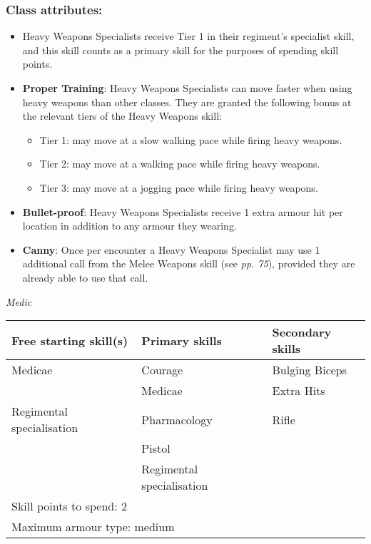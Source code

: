 \subsubsection{Class attributes:}

\begin{itemize}
\item Heavy Weapons Specialists receive Tier 1 in their regiment's specialist skill, and this skill counts as a primary skill for the purposes of spending skill points.

\item \textbf{Proper Training}: Heavy Weapons Specialists can move faster when using heavy weapons than other classes. They are granted the following bonus at the relevant tiers of the Heavy Weapons skill:

\begin{itemize}
\item Tier 1: may move at a slow walking pace while firing heavy weapons.

\item Tier 2: may move at a walking pace while firing heavy weapons.

\item Tier 3: may move at a jogging pace while firing heavy weapons.

\end{itemize}
\item \textbf{Bullet-proof}: Heavy Weapons Specialists receive 1 extra armour hit per location in addition to any armour they wearing.

\item \textbf{Canny}: Once per encounter a Heavy Weapons Specialist may use 1 additional call from the Melee Weapons skill (see \textit{pp. 75}), provided they are already able to use that call.

\end{itemize}
\textit{Medic}

\begin{table}[H]
\begin{tabular}{|l|l|l|} \hline 
Free starting skill(s) & Primary skills & Secondary skills \\
 \hline Medicae & Courage & Bulging Biceps \\
 \hline  & Medicae & Extra Hits \\
 \hline Regimental specialisation & Pharmacology & Rifle \\
 \hline  & Pistol &  \\
 \hline  & Regimental specialisation &  \\
 \hline \multicolumn{3}{|l|}{Skill points to spend: 2} \\
 \hline \multicolumn{3}{|l|}{Maximum armour type: medium} \\
 \hline \end{tabular}

\end{table}

